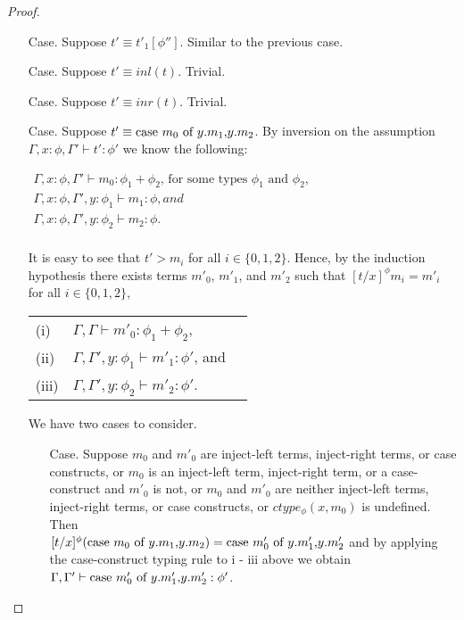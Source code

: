 \begin{proof}
\begin{itemize}
\item[Case.] Suppose $t' \equiv t'_1[\phi'']$. Similar to the previous case.  
  
\item[Case.] Suppose $t' \equiv inl(t)$. Trivial.
  
\item[Case.] Suppose $t' \equiv inr(t)$. Trivial.
  
\item[Case.] Suppose $t' \equiv \mbox{case}\ m_0\ \text{of}\ y\text{.}m_1\text{,}y\text{.}m_2$. By inversion on the assumption
  $\Gamma,x:\phi,\Gamma' \vdash t':\phi'$ we know the following:
  \begin{center}
    \begin{math}
      \begin{array}{lll}
        \Gamma,x:\phi,\Gamma' \vdash m_0:\phi_1+\phi_2 \text{, for some types } \phi_1 \text{ and } \phi_2,\\
        \Gamma,x:\phi,\Gamma',y:\phi_1 \vdash m_1:\phi, and\\
        \Gamma,x:\phi,\Gamma',y:\phi_2 \vdash m_2:\phi.\\
      \end{array}
    \end{math}
  \end{center}
  It is easy to see that
  $t' > m_i$ for all $i \in \{0,1,2\}$.  Hence, by the induction hypothesis
  there exists terms $m'_0$, $m'_1$, and $m'_2$ such that $[t/x]^\phi m_i = m'_i$ for all $i \in \{0,1,2\}$,
  \begin{center}
    \begin{tabular}{lll}
      (i)   & $\Gamma,\Gamma \vdash m'_0:\phi_1+\phi_2$,  \\
      (ii)  & $\Gamma,\Gamma',y:\phi_1 \vdash m'_1:\phi'$, and\\
      (iii) & $\Gamma,\Gamma',y:\phi_2 \vdash m'_2:\phi'$.  
    \end{tabular}
  \end{center}
  We have two cases to consider.
  \begin{itemize}
  \item[Case.] Suppose $m_0$ and $m'_0$ are inject-left terms, inject-right terms, or case constructs,
    or $m_0$ is an inject-left term, inject-right term, or a case-construct and $m'_0$ is not, or
    $m_0$ and $m'_0$ are neither inject-left terms, inject-right terms, or case constructs, or
    $ctype_\phi(x,m_0)$ is undefined.
    Then \\
    $[t/x]^{\phi} (\mbox{case}\ m_0\ \text{of}\ y\text{.}m_1\text{,}y\text{.}m_2) = \mbox{case}\ m'_0\ \text{of}\ y\text{.}m'_1\text{,}y\text{.}m'_2$ and by applying the case-construct 
    typing rule to i - iii above we obtain \\ $\Gamma,\Gamma' \vdash \mbox{case}\ m'_0\ \text{of}\ y\text{.}m'_1\text{,}y\text{.}m'_2:\phi'$.
    

\end{itemize}
\end{itemize}
\end{proof}
